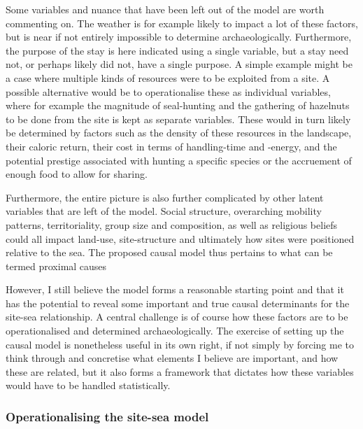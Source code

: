 \documentclass[
  a4paper,
  oneside]{uiophdthesis}
\begin{document}
Some variables and nuance that have been left out of the model are worth commenting on. The weather is for example likely to impact a lot of these factors, but is near if not entirely impossible to determine archaeologically. Furthermore, the purpose of the stay is here indicated using a single variable, but a stay need not, or perhaps likely did not, have a single purpose. A simple example might be a case where multiple kinds of resources were to be exploited from a site. A possible alternative would be to operationalise these as individual variables, where for example the magnitude of seal-hunting and the gathering of hazelnuts to be done from the site is kept as separate variables. These would in turn likely be determined by factors such as the density of these resources in the landscape, their caloric return, their cost in terms of handling-time and -energy, and the potential prestige associated with hunting a specific species or the accruement of enough food to allow for sharing.

Furthermore, the entire picture is also further complicated by other latent variables that are left of the model. Social structure, overarching mobility patterns, territoriality, group size and composition, as well as religious beliefs could all impact land-use, site-structure and ultimately how sites were positioned relative to the sea. The proposed causal model thus pertains to what can be termed proximal causes

However, I still believe the model forms a reasonable starting point and that it has the potential to reveal some important and true causal determinants for the site-sea relationship. A central challenge is of course how these factors are to be operationalised and determined archaeologically. The exercise of setting up the causal model is nonetheless useful in its own right, if not simply by forcing me to think through and concretise what elements I believe are important, and how these are related, but it also forms a framework that dictates how these variables would have to be handled statistically.

\hypertarget{operationalising-the-site-sea-model}{%
\subsubsection{Operationalising the site-sea model}\label{operationalising-the-site-sea-model}}
\end{document}
